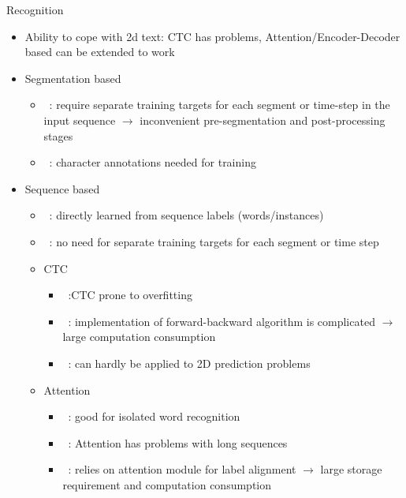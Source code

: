 Recognition
\begin{itemize}
    \item Ability to cope with 2d text:
        CTC has problems,
        Attention/Encoder-Decoder based can be extended to work
    \item Segmentation based
        \begin{itemize}
            \item~\cite{xie_aggregation_2019}: require separate training targets for each segment
                or time-step in the input sequence $\rightarrow$ inconvenient pre-segmentation and
                post-processing stages
            \item~\cite{shi_end--end_2017}: character annotations needed for training
        \end{itemize}
    \item Sequence based
        \begin{itemize}
            \item~\cite{shi_end--end_2017}: directly learned from sequence labels (words/instances)
            \item~\cite{xie_aggregation_2019}: no need for separate training targets for each segment
                or time step
            \item CTC
                \begin{itemize}
                    \item~\cite{chen_text_2021}:CTC prone to overfitting
                    \item~\cite{xie_aggregation_2019}: implementation of forward-backward algorithm
                        is complicated $\rightarrow$ large computation consumption
                    \item~\cite{xie_aggregation_2019}: can hardly be applied to 2D prediction
                        problems
                \end{itemize}
            \item Attention
                \begin{itemize}
                    \item~\cite{chen_text_2021}: good for isolated word recognition
                    \item~\cite{chen_text_2021}: Attention has problems with long sequences
                    \item~\cite{xie_aggregation_2019}: relies on attention module for label alignment
                        $\rightarrow$ large storage requirement and computation consumption

\end{itemize}
\end{itemize}
\end{itemize}
